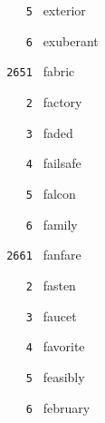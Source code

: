 \documentclass[11pt]{article}
\begin{document}
\begin{multicols}{6}
\noindent \texttt{ \ \ \ 5 } exterior  \par
\noindent \texttt{ \ \ \ 6 } exuberant  \par
\vspace{3mm}
\noindent \texttt{ 2651 } fabric  \par
\noindent \texttt{ \ \ \ 2 } factory  \par
\noindent \texttt{ \ \ \ 3 } faded  \par
\noindent \texttt{ \ \ \ 4 } failsafe  \par
\noindent \texttt{ \ \ \ 5 } falcon  \par
\noindent \texttt{ \ \ \ 6 } family  \par
\vspace{3mm}
\noindent \texttt{ 2661 } fanfare  \par
\noindent \texttt{ \ \ \ 2 } fasten  \par
\noindent \texttt{ \ \ \ 3 } faucet  \par
\noindent \texttt{ \ \ \ 4 } favorite  \par
\noindent \texttt{ \ \ \ 5 } feasibly  \par
\noindent \texttt{ \ \ \ 6 } february  \par
\end{multicols}
\end{document}
